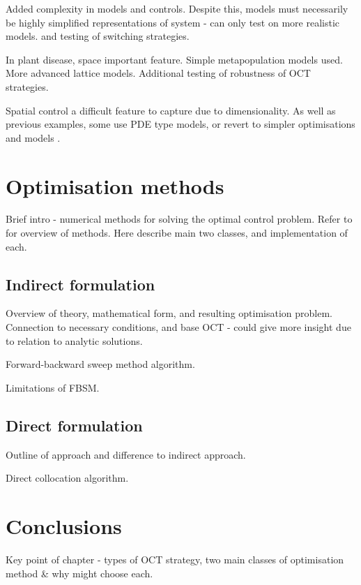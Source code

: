 Added complexity in models and controls. Despite this, models must necessarily be highly simplified representations of system - can only test on more realistic models. \citet{rowthorn_optimal_2009} and testing of switching strategies.

In plant disease, space important feature. Simple metapopulation models used. More advanced lattice models. Additional testing of robustness of OCT strategies.

Spatial control a difficult feature to capture due to dimensionality. As well as previous examples, some use PDE type models, or revert to simpler optimisations and models \citep{epanchin_optimal_2012}.

\section{Optimisation methods}\label{sec:ch2:optim_methods}

Brief intro - numerical methods for solving the optimal control problem. Refer to \citep{betts_practical_2010} for overview of methods. Here describe main two classes, and implementation of each.

\subsection{Indirect formulation}

Overview of theory, mathematical form, and resulting optimisation problem. Connection to necessary conditions, and base OCT - could give  more insight due to relation to analytic solutions.

Forward-backward sweep method algorithm.

Limitations of FBSM.

\subsection{Direct formulation}

Outline of approach and difference to indirect approach.

Direct collocation algorithm.

\section{Conclusions}

Key point of chapter - types of OCT strategy, two main classes of optimisation method \& why might choose each.